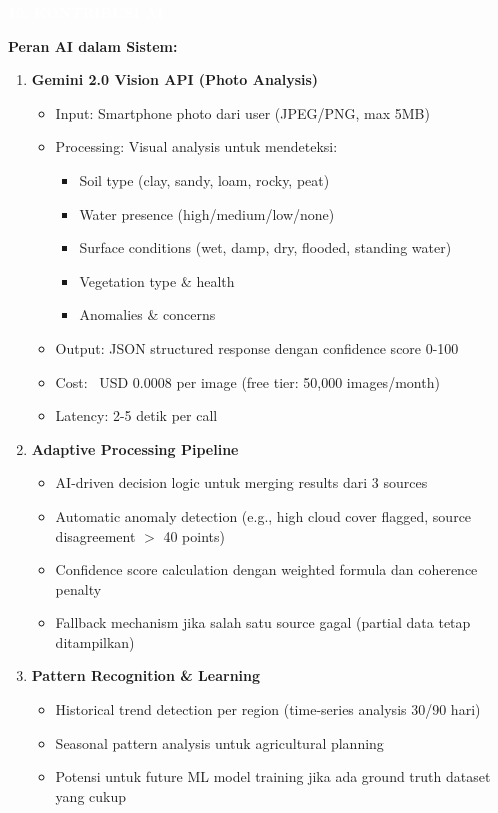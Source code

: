 \documentclass[12pt,a4paper]{article}
\newcommand{\sectionbox}[1]{%
  \colorbox{samsungblue}{%
    \parbox{\textwidth}{%
      \textcolor{white}{\large\bfseries #1}%
    }%
  }%
}
\newcommand{\subsectionbox}[1]{%
  \textbf{\large #1}\\[0.3cm]
}
\begin{document}
\vspace{1cm}

\sectionbox{10. KONTRIBUSI AI}

\vspace{0.5cm}

\subsectionbox{Peran AI dalam Sistem:}

\begin{enumerate}
  \item \textbf{Gemini 2.0 Vision API (Photo Analysis)}
  \begin{itemize}
    \item Input: Smartphone photo dari user (JPEG/PNG, max 5MB)
    \item Processing: Visual analysis untuk mendeteksi:
    \begin{itemize}
      \item Soil type (clay, sandy, loam, rocky, peat)
      \item Water presence (high/medium/low/none)
      \item Surface conditions (wet, damp, dry, flooded, standing water)
      \item Vegetation type \& health
      \item Anomalies \& concerns
    \end{itemize}
    \item Output: JSON structured response dengan confidence score 0-100
    \item Cost: ~USD 0.0008 per image (free tier: 50,000 images/month)
    \item Latency: 2-5 detik per call
  \end{itemize}

  \item \textbf{Adaptive Processing Pipeline}
  \begin{itemize}
    \item AI-driven decision logic untuk merging results dari 3 sources
    \item Automatic anomaly detection (e.g., high cloud cover flagged, source disagreement $>$ 40 points)
    \item Confidence score calculation dengan weighted formula dan coherence penalty
    \item Fallback mechanism jika salah satu source gagal (partial data tetap ditampilkan)
  \end{itemize}

  \item \textbf{Pattern Recognition \& Learning}
  \begin{itemize}
    \item Historical trend detection per region (time-series analysis 30/90 hari)
    \item Seasonal pattern analysis untuk agricultural planning
    \item Potensi untuk future ML model training jika ada ground truth dataset yang cukup
  \end{itemize}
\end{enumerate}
\end{document}
